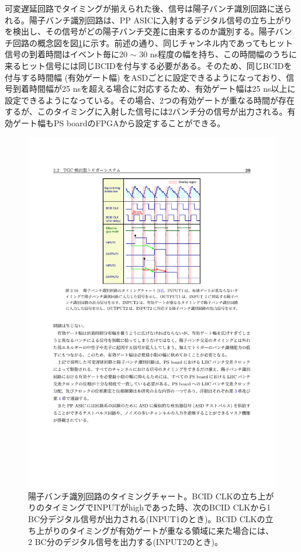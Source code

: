     可変遅延回路でタイミングが揃えられた後、信号は陽子バンチ識別回路に送られる。陽子バンチ識別回路は、PP ASICに入射するデジタル信号の立ち上がりを検出し、その信号がどの陽子バンチ交差に由来するのか識別する。陽子バンチ回路の概念図を図\ref{TGC_BCID}に示す。前述の通り、同じチャンネル内であってもヒット信号の到着時間はイベント毎に20 $\sim$ 30 ns程度の幅を持ち、この時間幅のうちに来るヒット信号には同じBCIDを付与する必要がある。そのため、同じBCIDを付与する時間幅 (有効ゲート幅) をASDごとに設定できるようになっており、信号到着時間幅が25 nsを超える場合に対応するため、有効ゲート幅は25 ns以上に設定できるようになっている。その場合、2つの有効ゲートが重なる時間が存在するが、このタイミングに入射した信号には2バンチ分の信号が出力される。有効ゲート幅もPS boardのFPGAから設定することができる。

    \begin{figure} 
    \centering
    \includegraphics[width=14cm]{fig/Intro/TGC_BCID.pdf}
    \caption[陽子バンチ識別回路のタイミングチャート]{陽子バンチ識別回路のタイミングチャート\cite{mt_takemoto}。BCID CLKの立ち上がりのタイミングでINPUTがhighであった時、次のBCID CLKから1 BC分デジタル信号が出力される(INPUT1のとき)。BCID CLKの立ち上がりのタイミングが有効ゲートが重なる領域に来た場合には、2 BC分のデジタル信号を出力する(INPUT2のとき)。}
    \label{TGC_BCID}
    \end{figure}

